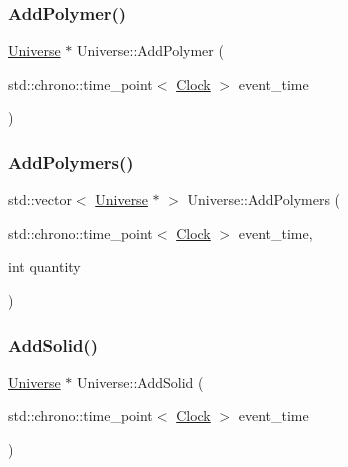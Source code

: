 \mbox{\label{classUniverse_a4ea0af5d2eb7b5070a83f7da29526fbd}} 
\subsubsection{\texorpdfstring{Add\+Polymer()}{AddPolymer()}}
{\footnotesize\ttfamily \mbox{\hyperlink{classUniverse}{Universe}} $\ast$ Universe\+::\+Add\+Polymer (\begin{DoxyParamCaption}\item[{std\+::chrono\+::time\+\_\+point$<$ \mbox{\hyperlink{universe_8h_a0ef8d951d1ca5ab3cfaf7ab4c7a6fd80}{Clock}} $>$}]{event\+\_\+time }\end{DoxyParamCaption})}

\mbox{\label{classUniverse_aed7cb25507d516a2821ebb69d5345c54}} 
\subsubsection{\texorpdfstring{Add\+Polymers()}{AddPolymers()}}
{\footnotesize\ttfamily std\+::vector$<$ \mbox{\hyperlink{classUniverse}{Universe}} $\ast$ $>$ Universe\+::\+Add\+Polymers (\begin{DoxyParamCaption}\item[{std\+::chrono\+::time\+\_\+point$<$ \mbox{\hyperlink{universe_8h_a0ef8d951d1ca5ab3cfaf7ab4c7a6fd80}{Clock}} $>$}]{event\+\_\+time,  }\item[{int}]{quantity }\end{DoxyParamCaption})}

\mbox{\label{classUniverse_a598799e2fcdf9ed60e83e9f5a61bfc05}} 
\subsubsection{\texorpdfstring{Add\+Solid()}{AddSolid()}}
{\footnotesize\ttfamily \mbox{\hyperlink{classUniverse}{Universe}} $\ast$ Universe\+::\+Add\+Solid (\begin{DoxyParamCaption}\item[{std\+::chrono\+::time\+\_\+point$<$ \mbox{\hyperlink{universe_8h_a0ef8d951d1ca5ab3cfaf7ab4c7a6fd80}{Clock}} $>$}]{event\+\_\+time }\end{DoxyParamCaption})}

